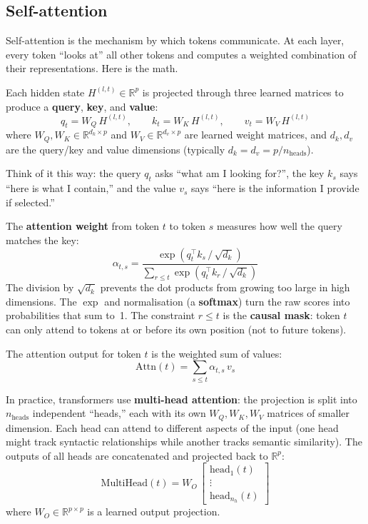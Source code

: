 \documentclass[11pt, twoside, openright]{memoir}
\numberwithin{equation}{chapter}
\begin{document}
\subsection*{Self-attention}

Self-attention is the mechanism by which tokens communicate.  At each
layer, every token ``looks at'' all other tokens and computes a
weighted combination of their representations.  Here is the math.

Each hidden state $H^{(l,t)} \in \mathbb{R}^p$ is projected through
three learned matrices to produce a \textbf{query}, \textbf{key}, and
\textbf{value}:
\begin{equation}
  q_t = W_Q \, H^{(l,t)}, \qquad
  k_t = W_K \, H^{(l,t)}, \qquad
  v_t = W_V \, H^{(l,t)}
\end{equation}
where $W_Q, W_K \in \mathbb{R}^{d_k \times p}$ and
$W_V \in \mathbb{R}^{d_v \times p}$ are learned weight matrices, and
$d_k, d_v$ are the query/key and value dimensions
(typically $d_k = d_v = p / n_{\text{heads}}$).

Think of it this way: the query $q_t$ asks ``what am I looking for?'',
the key $k_s$ says ``here is what I contain,'' and the value $v_s$ says
``here is the information I provide if selected.''

The \textbf{attention weight} from token $t$ to token $s$ measures how
well the query matches the key:
\begin{equation}
  \alpha_{t,s} = \frac{\exp(q_t^\top k_s \,/\, \sqrt{d_k})}
                      {\sum_{r \le t} \exp(q_t^\top k_r \,/\, \sqrt{d_k})}
\end{equation}
The division by $\sqrt{d_k}$ prevents the dot products from growing too
large in high dimensions.  The $\exp$ and normalisation (a
\textbf{softmax}) turn the raw scores into probabilities that sum to~1.
The constraint $r \le t$ is the \textbf{causal mask}: token $t$ can
only attend to tokens at or before its own position (not to future
tokens).

The attention output for token $t$ is the weighted sum of values:
\begin{equation}
  \mathrm{Attn}(t) = \sum_{s \le t} \alpha_{t,s} \, v_s
\end{equation}

In practice, transformers use \textbf{multi-head attention}: the
projection is split into $n_{\text{heads}}$ independent ``heads,'' each
with its own $W_Q, W_K, W_V$ matrices of smaller dimension.  Each head
can attend to different aspects of the input (one head might track
syntactic relationships while another tracks semantic similarity).
The outputs of all heads are concatenated and projected back to
$\mathbb{R}^p$:
\begin{equation}
  \mathrm{MultiHead}(t) = W_O \,
    \begin{bmatrix} \mathrm{head}_1(t) \\ \vdots \\ \mathrm{head}_{n_h}(t) \end{bmatrix}
\end{equation}
where $W_O \in \mathbb{R}^{p \times p}$ is a learned output projection.
\end{document}
